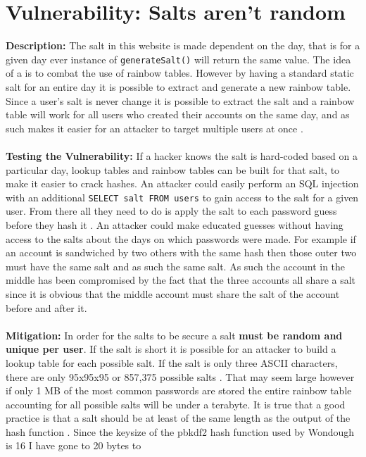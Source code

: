 \section{Vulnerability: Salts aren't random}
\label{sec:background}
\textbf{Description:} The salt in this website is made dependent on the day, that is for a given day ever instance of \verb|generateSalt()| will return the same value. The idea of a
is to combat the use of rainbow tables. However by having a standard static salt for an entire day it is possible to extract and generate a new rainbow table. Since a user's salt is
never change it is possible to extract the salt and a rainbow table will work for all users who created their accounts on the same day, and as such makes it easier for an attacker
to target multiple users at once \cite{salts1}. \\ \\
\textbf{Testing the Vulnerability:} If a hacker knows the salt is hard-coded based on a particular day, lookup tables and rainbow tables can be built for that salt, to make it
easier to crack hashes. An attacker could easily perform an SQL injection with an additional \verb|SELECT salt FROM users| to gain access to the salt for a given user. From there
all they need to do is apply the salt to each password guess before they hash it \cite{salts2}. An attacker could make educated guesses without having access to the salts about the days on which passwords were
made. For example if an account is sandwiched by two others with the same hash then those outer two must have the same salt and as such the same salt. As such the account in the
middle has been compromised by the fact that the three accounts all share a salt since it is obvious that the middle account must share the salt of the account before and after
it.\\ \\
\textbf{Mitigation:} In order for the salts to be secure a salt \textbf{must be random and unique per user}. If the salt is short it is possible for an attacker to build a
lookup table for each possible salt. If the salt is only three ASCII characters, there are only 95x95x95 or 857,375 possible salts \cite{salts1}. That may seem large however if
only 1 MB of the most common passwords are stored the entire rainbow table accounting for all possible salts will be under a terabyte. It is true that a good practice is that a
salt should be at least of the same length as the output of the hash function \cite{6516321}. Since the keysize of the pbkdf2 hash function used by Wondough is 16 I have gone to 20 bytes to
